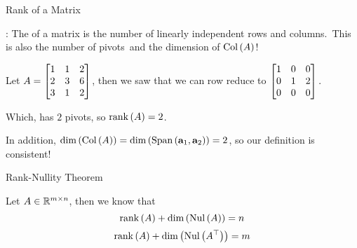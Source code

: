 \documentclass[xcoler=dvipsnames, aspectratio=169]{beamer}
\begin{document}
    \begin{frame}{Rank of a Matrix}
        \begin{defn}
            : The  of a matrix is the number of linearly independent rows 
            and columns.\pause\ This is also the number of pivots\pause\ and the dimension of $\mathrm{Col}\left(A\right)$!
        \end{defn}
        \begin{example}
            Let $A = \begin{bmatrix}1&1&2\\2&3&6\\3&1&2\end{bmatrix}$, then we saw that we can row reduce to
            $
                \begin{bmatrix}
                    1 & 0 & 0\\
                    0 & 1 & 2\\
                    0 & 0 & 0
                \end{bmatrix}.
            $\pause

            Which, has $2$ pivots, so $\mathrm{rank}\left(A\right)=2$.\pause

            In addition, $\dim{\colS{A}} = \dim{\Span{\vec{a}_1,\vec{a}_2}} = 2$, so our definition is consistent!
        \end{example}
    \end{frame}
    \begin{frame}{Rank-Nullity Theorem}
        \begin{theorem}
            Let $A\in\mathbb{R}^{m\times n}$, then we know that
            \[
                \rank{A} + \dim{\nullS{A}} = n
            \]
            \[
                \rank{A} + \dim{\nullS{A^\top}} = m
            \]
        \end{theorem}
    \end{frame}
\end{document}
